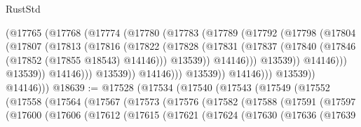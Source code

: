 \begin{lexlean}{RustStd}
\begin{coremodule}
                                (@17765
                                  (@17768
                                    (@17774
                                      (@17780
                                        (@17783
                                          (@17789
                                            (@17792
                                              (@17798
                                                (@17804
                                                  (@17807
                                                    (@17813
                                                      (@17816
                                                        (@17822
                                                          (@17828
                                                            (@17831
                                                              (@17837
                                                                (@17840
                                                                  (@17846
                                                                    (@17852
                                                                      (@17855 @18543)
                                                                      @14146)))
                                                                @13539))
                                                            @14146)))
                                                      @13539))
                                                  @14146)))
                                            @13539))
                                        @14146)))
                                  @13539))
                              @14146)))
                        @13539))
                    @14146)))
              @13539))
          @14146)))
@18639 := @17528
    (@17534
      (@17540
        (@17543
          (@17549
            (@17552
              (@17558
                (@17564
                  (@17567
                    (@17573
                      (@17576
                        (@17582
                          (@17588
                            (@17591
                              (@17597
                                (@17600
                                  (@17606
                                    (@17612
                                      (@17615
                                        (@17621
                                          (@17624
                                            (@17630
                                              (@17636
                                                (@17639

\end{coremodule}
\end{lexlean}
